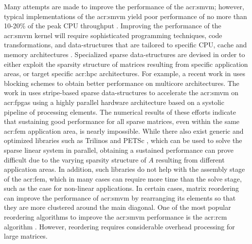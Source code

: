 Many attempts are made to improve the performance of the \gls{acr:smvm}; however, typical implementations of the \gls{acr:smvm} yield poor performance of no more than 10-20\% of the peak CPU throughput \cite{bib:Demmel2007OODMVMOEMP}.
Improving the performance of the \gls{acr:smvm} kernel will require sophisticated programming techniques, code transformations, and data-structures that are tailored to specific CPU, cache and memory architectures \cite{bib:DemmelOSKI}.
Specialized sparse data-structures are devised in order to either exploit the sparsity structure of matrices resulting from specific application areas, or target specific \gls{acr:hpc} architectures.
For example, a recent work in \cite{bib:david2010mabpmt} uses blocking schemes to obtain better performance on multicore architectures.
The work in \cite{bib:elkurdi2007hafem,bib:El-Kurdi2008FAAIOSMMFTFEM} uses stripe-based sparse data-structures to accelerate the \gls{acr:smvm} on \glspl{acr:fpga} using a highly parallel hardware architecture based on a systolic pipeline of processing elements.
The numerical results of these efforts indicate that sustaining good performance for all sparse matrices, even within the same \gls{acr:fem} application area, is nearly impossible.
While there also exist generic and optimized libraries such as Trilinos \cite{bib:Trilinos} and PETSc \cite{bib:PETSc}, which can be used to solve the sparse linear system in parallel, obtaining a sustained performance can prove difficult due to the varying sparsity structure of $A$ resulting from different application areas.
In addition, such libraries do not help with the assembly stage of the \gls{acr:fem}, which in many cases can require more time than the solve stage, such as the case for non-linear applications.
In certain cases, matrix reordering can improve the performance of \gls{acr:smvm} by rearranging its elements so that they are more clustered around the main diagonal.
One of the most popular reordering algorithms to improve the \gls{acr:smvm} performance is the \gls{acr:rcm} algorithm \cite{bib:Cuthill1969RTBOSSM}. 
However, reordering requires considerable overhead processing for large matrices.


